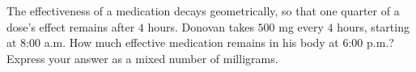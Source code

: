 The effectiveness of a medication decays geometrically, so that one quarter of a dose's effect remains after $4$ hours. Donovan takes $500$ mg every $4$ hours, starting at 8:00 a.m. How much effective medication remains in his body at 6:00 p.m.? Express your answer as a mixed number of milligrams.
